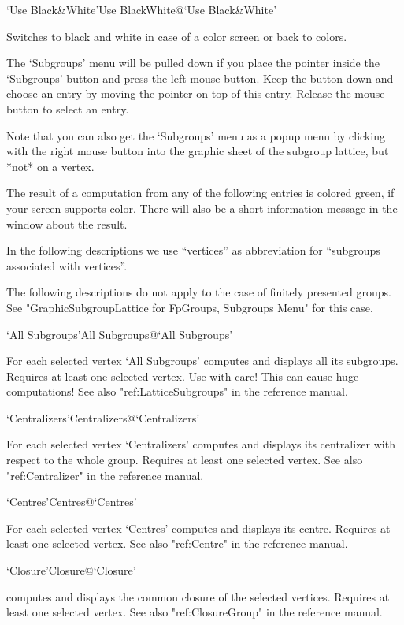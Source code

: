 \>`Use Black\&White'{Use BlackWhite}@{`Use Black\&White'}

Switches to black and white in case of a color screen or back to colors.



The `Subgroups' menu will be pulled down  if you place the pointer inside
the `Subgroups' button and press the left mouse  button.  Keep the button
down and choose an entry   by moving the pointer  on  top of this  entry.
Release the mouse button to select an entry.

Note that you can also get the `Subgroups' menu as a popup menu by
clicking with the right mouse button into the graphic sheet of the subgroup
lattice, but *not* on a vertex.

The result   of a computation from   any of the  following  entries is
colored green, if your screen supports color.  There will also be a short
information message in the {\GAP} window about the result.

In the following descriptions   we use ``vertices'' as abbreviation  for
``subgroups associated with vertices''.

The following descriptions do not apply to the case of finitely presented
groups. See "GraphicSubgroupLattice for FpGroups, Subgroups Menu" for this
case. 

\>`All Subgroups'{All Subgroups}@{`All Subgroups'}

For each selected vertex `All Subgroups' computes and displays all its
subgroups. Requires at least one selected vertex. Use with care! This can
cause huge computations!  See also "ref:LatticeSubgroups" in the {\GAP}
reference manual.

\>`Centralizers'{Centralizers}@{`Centralizers'}

For each selected vertex `Centralizers' computes and displays its
centralizer with respect to the whole group.  Requires at least one
selected vertex.  See also "ref:Centralizer" in the {\GAP}
reference manual.

\>`Centres'{Centres}@{`Centres'}

For each selected vertex `Centres' computes and displays its centre.
Requires at least one selected vertex. See also "ref:Centre" in the {\GAP}
reference manual.

\>`Closure'{Closure}@{`Closure'}

computes and displays the common closure of the selected vertices.
Requires at least one selected vertex. See also "ref:ClosureGroup" in the
{\GAP} reference manual.

